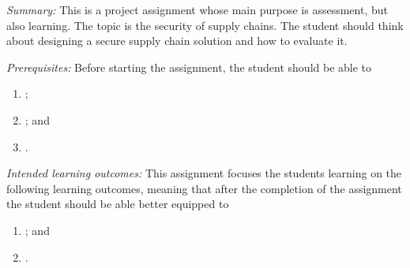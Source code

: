 
\emph{Summary:}
This is a project assignment whose main purpose is assessment, but also 
learning.
The topic is the security of supply chains.
The student should think about designing a secure supply chain solution and how 
to evaluate it.

\emph{Prerequisites:}
Before starting the assignment, the student should be able to
\begin{enumerate}[label={(LO\arabic*)},ref=LO\arabic*]
  \item \LOrelate;
  \item \LOevaluate; and
  \item \LOapply.
\end{enumerate}

\emph{Intended learning outcomes:}
This assignment focuses the students learning on the following learning 
outcomes, meaning that after the completion of the assignment the student 
should be able better equipped to
\begin{enumerate}[label={(LO\arabic*)},ref=LO\arabic*,resume]
  \item \LOplan; and
  \item \LOcomm.
\end{enumerate}

